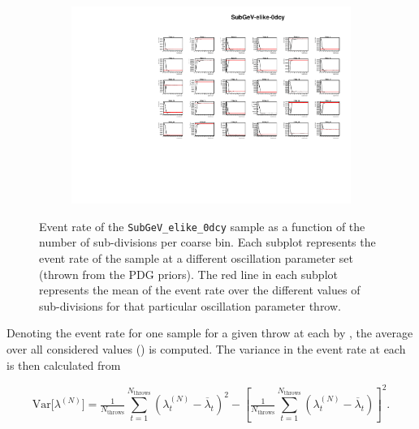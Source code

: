 \begin{figure}[h]
  \begin{subfigure}[t]{\textwidth}
    \includegraphics[width=\textwidth, trim={0mm 0mm 0mm 0mm}, clip,page=1]{Figures/Oscillation/EventRate_VariableGraphs.pdf}
  \end{subfigure}
  \caption{Event rate of the \texttt{SubGeV\_elike\_0dcy} sample as a function of the number of sub-divisions per coarse bin. Each subplot represents the event rate of the sample at a different oscillation parameter set (thrown from the PDG priors). The red line in each subplot represents the mean of the event rate over the different values of sub-divisions for that particular oscillation parameter throw.}
  \label{fig:Oscillation_SK_EventRateVariable}
\end{figure}

Denoting the event rate for one sample for a given throw  at each  by , the average over all considered  values () is computed. The variance in the event rate at each  is then calculated from

\begin{equation}
  \mathrm{Var}\Big[\lambda^{(N)}] = \tfrac{1}{N_\mathrm{throws}} \sum_{t=1}^{N_\mathrm{throws}} \left(\lambda_t^{(N)} - \overline \lambda_t\right)^2 - \left[\tfrac{1}{N_\mathrm{throws}} \sum_{t=1}^{N_\mathrm{throws}} \left(\lambda_t^{(N)} - \overline \lambda_t\right)\right]^2 .
  \label{eq:Oscillation_SK_Variance}
\end{equation}

